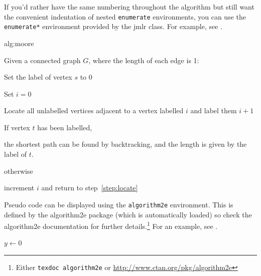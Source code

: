 \documentclass[pmlr,twocolumn,10pt]{jmlr} %
\begin{document}
If you'd rather have the same numbering throughout the algorithm
but still want the convenient indentation of nested 
\texttt{enumerate} environments, you can use the
\texttt{enumerate*} environment provided by the \textsf{jmlr}
class. For example, see .

\begin{algorithm}
\floatconts
  {alg:moore}%
  {\caption{Moore's Shortest Path}}%
{%
Given a connected graph $G$, where the length of each edge is 1:
\begin{enumerate*}
  \item Set the label of vertex $s$ to 0
  \item Set $i=0$
  \begin{enumerate*}
    \item \label{step:locate}Locate all unlabelled vertices 
          adjacent to a vertex labelled $i$ and label them $i+1$
    \item If vertex $t$ has been labelled,
    \begin{enumerate*}
      \item[] the shortest path can be found by backtracking, and 
      the length is given by the label of $t$.
    \end{enumerate*}
    otherwise
    \begin{enumerate*}
      \item[] increment $i$ and return to step~\ref{step:locate}
    \end{enumerate*}
  \end{enumerate*}
\end{enumerate*}
}%
\end{algorithm}

Pseudo code can be displayed using the \texttt{algorithm2e}
environment. This is defined by the \textsf{algorithm2e} package
(which is automatically loaded) so check the \textsf{algorithm2e}
documentation for further details.\footnote{Either \texttt{texdoc
algorithm2e} or \url{http://www.ctan.org/pkg/algorithm2e}}
For an example, see .

\begin{algorithm2e}
\caption{Computing Net Activation}
\label{alg:net}
{}
$y\leftarrow 0$\;
\end{algorithm2e}
\end{document}
